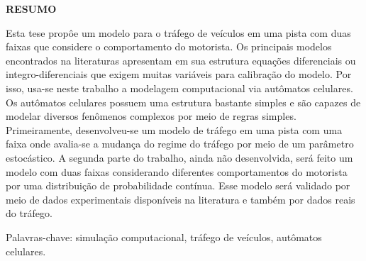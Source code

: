 %
\newpage
\singlespacing\thispagestyle{empty}
\begin{center}
{\bf RESUMO}
\end{center}

Esta tese propôe um modelo para o tráfego de veículos em uma pista com duas faixas que considere o comportamento do motorista. Os principais modelos encontrados na literaturas apresentam em sua estrutura equações diferenciais ou integro-diferenciais que exigem muitas variáveis para calibração do modelo. Por isso, usa-se neste trabalho a modelagem computacional via autômatos celulares. Os autômatos celulares possuem uma estrutura bastante simples e são capazes de modelar diversos fenômenos complexos por meio de regras simples. Primeiramente, desenvolveu-se um modelo de tráfego em uma pista com uma faixa onde avalia-se a mudança do regime do tráfego por meio de um parâmetro estocástico. A segunda parte do trabalho, ainda não desenvolvida, será feito um modelo com duas faixas considerando diferentes comportamentos do motorista por uma distribuição de probabilidade contínua. Esse modelo será validado por meio de dados experimentais disponíveis na literatura e também por dados reais do tráfego.


\vspace{1.5cm}
\noindent Palavras-chave: simulação computacional, tráfego de veículos, autômatos celulares.



%



